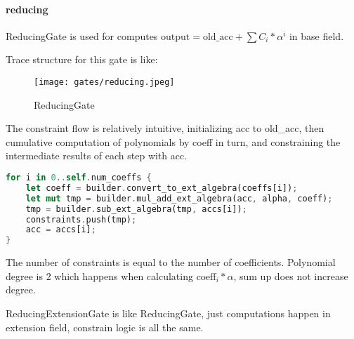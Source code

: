 \paragraph{reducing}

ReducingGate is used for computes $\text{output} = \text{old\_acc} + \sum C_i*\alpha^i$ in base field.

Trace structure for this gate is like:

\begin{figure}[!ht]
    \centering
    \texttt{[image: gates/reducing.jpeg]}
    \caption{ReducingGate}
    \label{fig:reducing}
\end{figure}

The constraint flow is relatively intuitive, initializing acc to old\_acc, then cumulative computation of polynomials by coeff in turn, 
and constraining the intermediate results of each step with acc.

\begin{lstlisting}[language=rust]
for i in 0..self.num_coeffs {
    let coeff = builder.convert_to_ext_algebra(coeffs[i]);
    let mut tmp = builder.mul_add_ext_algebra(acc, alpha, coeff);
    tmp = builder.sub_ext_algebra(tmp, accs[i]);
    constraints.push(tmp);
    acc = accs[i];
}
\end{lstlisting}

The number of constraints is equal to the number of coefficients. Polynomial degree is 2 which happens when calculating $\text{coeff}_i * \alpha$, sum up does not increase degree.

ReducingExtensionGate is like ReducingGate, just computations happen in extension field, constrain logic is all the same.
